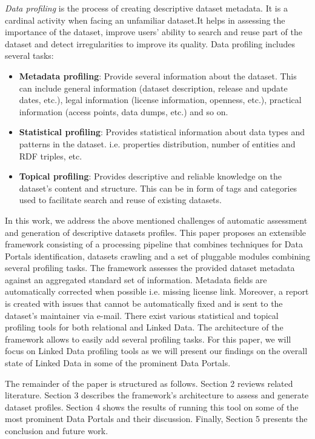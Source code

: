 \documentclass[runningheads,a4paper]{llncs}
\begin{document}
\textit{Data profiling} is the process of creating descriptive dataset metadata. It is a cardinal activity when facing an unfamiliar dataset\cite{semwebprofiling}.It helps in assessing the importance of the dataset, improve users' ability to search and reuse part of the dataset and detect irregularities to improve its quality. Data profiling includes several tasks:
\begin{itemize}
  \item \textbf{Metadata profiling}: Provide several information about the dataset. This can include general information (dataset description, release and update dates, etc.), legal information (license information, openness, etc.), practical information (access points, data dumps, etc.) and so on.
  \item \textbf{Statistical profiling}: Provides statistical information about data types and patterns in the dataset. i.e. properties distribution, number of entities and RDF triples, etc.
  \item \textbf{Topical profiling}: Provides descriptive and reliable knowledge on the dataset's content and structure. This can be in form of tags and categories used to facilitate search and reuse of existing datasets.
\end{itemize}

In this work, we address the above mentioned challenges of automatic assessment and generation of descriptive datasets profiles. This paper proposes an extensible framework consisting of a processing pipeline that combines techniques for Data Portals identification, datasets crawling and a set of pluggable modules combining several profiling tasks. The framework assesses the provided dataset metadata against an aggregated standard set of information. Metadata fields are automatically corrected when possible i.e. missing license link. Moreover, a report is created with issues that cannot be automatically fixed and is sent to the dataset's maintainer via e-mail. There exist various statistical and topical profiling tools for both relational and Linked Data. The architecture of the framework allows to easily add several profiling tasks. For this paper, we will focus on Linked Data profiling tools as we will present our findings on the overall state of Linked Data in some of the prominent Data Portals.

The remainder of the paper is structured as follows. Section 2 reviews related literature. Section 3 describes the framework's architecture to assess and generate dataset profiles. Section 4 shows the results of running this tool on some of the most prominent Data Portals and their discussion. Finally, Section 5 presents the conclusion and future work.



\nocite{*}

\end{document}
